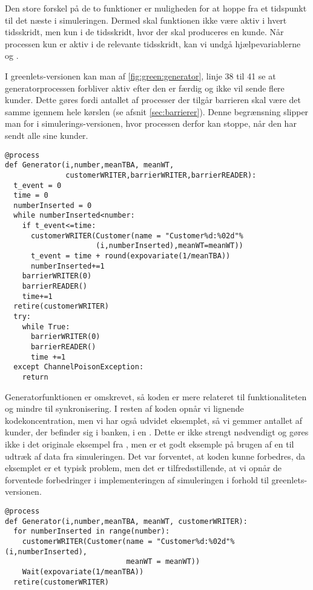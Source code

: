 Den store forskel på de to funktioner er muligheden for at hoppe fra et tidspunkt til det næste i simuleringen. Dermed skal funktionen ikke være aktiv i hvert tidsskridt, men kun i de tidsskridt, hvor der skal produceres en kunde. Når processen kun er aktiv i de relevante tidsskridt, kan vi undgå hjælpevariablerne  og . 

I  greenlets-versionen kan man af \cref{fig:green:generator}, linje 38 til 41 se at generatorprocessen forbliver aktiv efter den er færdig og ikke vil sende flere kunder. Dette gøres fordi antallet af processer der tilgår barrieren skal være det samme igennem hele kørslen (se afsnit \cref{sec:barrierer}).  Denne begrænsning slipper man for i simulerings-versionen, hvor processen derfor kan stoppe, når den har sendt alle sine kunder.

\begin{lstlisting}[firstnumber=21, label=fig:green:generator, caption=Generatorprocessen for greenlets-versionen]
@process
def Generator(i,number,meanTBA, meanWT,
              customerWRITER,barrierWRITER,barrierREADER):
  t_event = 0
  time = 0
  numberInserted = 0
  while numberInserted<number:
    if t_event<=time:
      customerWRITER(Customer(name = "Customer%d:%02d"%
                     (i,numberInserted),meanWT=meanWT))
      t_event = time + round(expovariate(1/meanTBA))
      numberInserted+=1
    barrierWRITER(0)
    barrierREADER()
    time+=1
  retire(customerWRITER)
  try:
    while True:
      barrierWRITER(0)
      barrierREADER()
      time +=1
  except ChannelPoisonException: 
    return
\end{lstlisting}

Generatorfunktionen er omskrevet, så koden er mere relateret til funktionaliteten og mindre til synkronisering.  I resten af koden opnår vi lignende kodekoncentration, men vi har også udvidet eksemplet, så vi gemmer antallet af kunder, der befinder sig i banken, i en . Dette er ikke strengt nødvendigt og gøres ikke i det originale eksempel fra \simpy, men er et godt eksemple på brugen af en  til udtræk af data fra simuleringen. Det var forventet, at koden kunne forbedres, da eksemplet er et typisk \des problem, men det er tilfredsstillende, at vi opnår de forventede forbedringer i implementeringen af simuleringen i forhold til greenlets-versionen.


\begin{lstlisting}[firstnumber=20, label=fig:sim:generator, caption=Generatorprocessen for simulerings-versionen]
@process
def Generator(i,number,meanTBA, meanWT, customerWRITER):
  for numberInserted in range(number):
    customerWRITER(Customer(name = "Customer%d:%02d"%(i,numberInserted),
                            meanWT = meanWT))
    Wait(expovariate(1/meanTBA))
  retire(customerWRITER)
\end{lstlisting}

